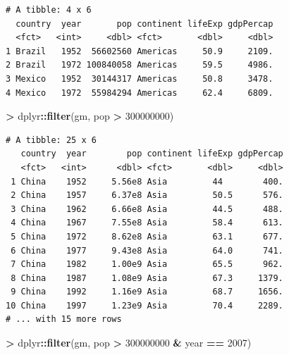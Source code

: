 \documentclass[]{krantz}
\makeatletter
\newenvironment{Shaded}{\begin{snugshade}}{\end{snugshade}}
\newcommand{\DecValTok}[1]{\textcolor[rgb]{0.06,0.06,0.06}{#1}}
\newcommand{\KeywordTok}[1]{\textcolor[rgb]{0.27,0.27,0.27}{\textbf{#1}}}
\newcommand{\NormalTok}[1]{#1}
\newcommand{\OperatorTok}[1]{\textcolor[rgb]{0.43,0.43,0.43}{\textbf{#1}}}
\newcommand{\StringTok}[1]{\textcolor[rgb]{0.5,0.5,0.5}{#1}}
\newenvironment{kframe}{%
\medskip{}
\setlength{\fboxsep}{.8em}
 \def\at@end@of@kframe{}%
 \ifinner\ifhmode%
  \def\at@end@of@kframe{\end{minipage}}%
  \begin{minipage}{\columnwidth}%
 \fi\fi%
 \def\FrameCommand##1{\hskip\@totalleftmargin \hskip-\fboxsep
 \colorbox{shadecolor}{##1}\hskip-\fboxsep
     \hskip-\linewidth \hskip-\@totalleftmargin \hskip\columnwidth}%
 \MakeFramed {\advance\hsize-\width
   \@totalleftmargin\z@ \linewidth\hsize
   \@setminipage}}%
 {\par\unskip\endMakeFramed%
 \at@end@of@kframe}
\renewenvironment{Shaded}{\begin{kframe}}{\end{kframe}}
\makeatother
\begin{document}
\begin{Shaded}
\end{Shaded}

\begin{verbatim}
# A tibble: 4 x 6
  country  year       pop continent lifeExp gdpPercap
  <fct>   <int>     <dbl> <fct>       <dbl>     <dbl>
1 Brazil   1952  56602560 Americas     50.9     2109.
2 Brazil   1972 100840058 Americas     59.5     4986.
3 Mexico   1952  30144317 Americas     50.8     3478.
4 Mexico   1972  55984294 Americas     62.4     6809.
\end{verbatim}

\begin{Shaded}
\begin{Highlighting}[]
\OperatorTok{>}\StringTok{ }\NormalTok{dplyr}\OperatorTok{::}\KeywordTok{filter}\NormalTok{(gm, pop }\OperatorTok{>}\StringTok{ }\DecValTok{300000000}\NormalTok{)}
\end{Highlighting}
\end{Shaded}

\begin{verbatim}
# A tibble: 25 x 6
   country  year        pop continent lifeExp gdpPercap
   <fct>   <int>      <dbl> <fct>       <dbl>     <dbl>
 1 China    1952     5.56e8 Asia         44        400.
 2 China    1957     6.37e8 Asia         50.5      576.
 3 China    1962     6.66e8 Asia         44.5      488.
 4 China    1967     7.55e8 Asia         58.4      613.
 5 China    1972     8.62e8 Asia         63.1      677.
 6 China    1977     9.43e8 Asia         64.0      741.
 7 China    1982     1.00e9 Asia         65.5      962.
 8 China    1987     1.08e9 Asia         67.3     1379.
 9 China    1992     1.16e9 Asia         68.7     1656.
10 China    1997     1.23e9 Asia         70.4     2289.
# ... with 15 more rows
\end{verbatim}

\begin{Shaded}
\begin{Highlighting}[]
\OperatorTok{>}\StringTok{ }\NormalTok{dplyr}\OperatorTok{::}\KeywordTok{filter}\NormalTok{(gm, pop }\OperatorTok{>}\StringTok{ }\DecValTok{300000000} \OperatorTok{&}\StringTok{ }\NormalTok{year }\OperatorTok{==}\StringTok{ }\DecValTok{2007}\NormalTok{)}
\end{Highlighting}
\end{Shaded}
\end{document}
